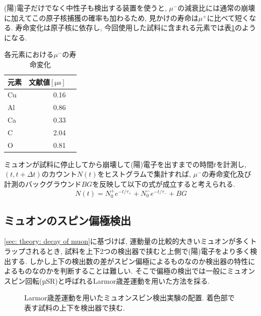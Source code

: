 \documentclass[dvipdfmx]{jsarticle}
\begin{document}
(陽)電子だけでなく中性子も検出する装置を使うと, $\mu^-$の減衰比には通常の崩壊に加えてこの原子核捕獲の確率も加わるため, 見かけの寿命は$\mu^+$に比べて短くなる.
寿命変化は原子核に依存し, 今回使用した試料に含まれる元素では表\ref{table: theory: life of muon}のようになる\cite{Ito Kaji Tabata Yoshiwara}.

\begin{table}
    \centering
    \caption{各元素における$\mu^-$の寿命変化}
    \begin{tabular}{lrr}
        \toprule
        元素 & 文献値$[\unit{\micro\second}]$
        \\
        \midrule
        Cu & 0.16
        \\
        Al & 0.86
        \\
        Ca & 0.33
        \\
        C & 2.04
        \\
        O & 0.81
        \\
        \bottomrule
    \end{tabular}
    \label{table: theory: life of muon}
\end{table}


ミュオンが試料に停止してから崩壊して(陽)電子を出すまでの時間$t$を計測し, $(t,t+\Delta t)$のカウント$N(t)$をヒストグラムで集計すれば, $\mu^-$の寿命変化及び計測のバックグラウンド$BG$を反映して以下の式が成立すると考えられる.
\begin{equation}
    \label{eq: N of t considering different tau and BG}
    N(t)
    =
    N_0^+e^{-t/\tau_+}
    +
    N_0^-e^{-t/\tau_-}
    +
    BG
\end{equation}


\subsection{ミュオンのスピン偏極検出}

\ref{sec: theory: decay of muon}に基づけば, 運動量の比較的大きいミュオンが多くトラップされるとき, 試料を上下2つの検出器で挟むと上側で(陽)電子をより多く検出する.
しかし上下の検出数の差がスピン偏極によるものなのか検出器の特性によるものなのかを判断することは難しい.
そこで偏極の検出では一般にミュオンスピン回転(µSR)と呼ばれるLarmor歳差運動を用いた方法を採る.

\begin{figure}[b]
    \centering
    
    \caption{Larmor歳差運動を用いたミュオンスピン検出実験の配置. 着色部で表す試料の上下を検出器で挟む.}
    \label{fig: Larmor spin}
\end{figure}
\end{document}
